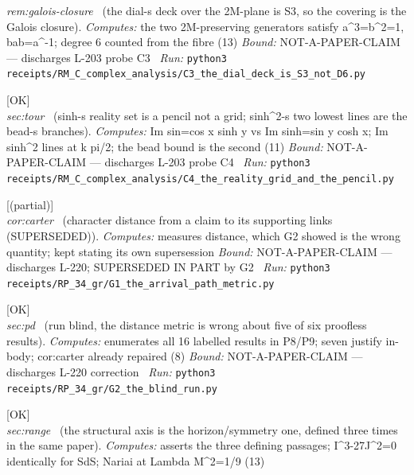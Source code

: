 \begin{description}
\textit{rem:galois-closure} \ (the dial-s deck over the 2M-plane is S3, so the covering is the Galois closure). 
\emph{Computes:} the two 2M-preserving generators satisfy a\textasciicircum{}3=b\textasciicircum{}2=1, bab=a\textasciicircum{}-1; degree 6 counted from the fibre (13)
 \emph{Bound:} NOT-A-PAPER-CLAIM --- discharges L-203 probe C3
\ \emph{Run:} \texttt{python3 receipts/RM\_C\_complex\_analysis/C3\_the\_dial\_deck\_is\_S3\_not\_D6.py}
\item[\label{rcpt:C4_the_reality_grid_and_the_pencil}\texttt{C4\_the\_reality\_grid\_and\_the\_pencil}]\hfill\textsf{[OK]}\\
\textit{sec:tour} \ (sinh-s reality set is a pencil not a grid; sinh\textasciicircum{}2-s two lowest lines are the bead-s branches). 
\emph{Computes:} Im sin=cos x sinh y vs Im sinh=sin y cosh x; Im sinh\textasciicircum{}2 lines at k pi/2; the bead bound is the second (11)
 \emph{Bound:} NOT-A-PAPER-CLAIM --- discharges L-203 probe C4
\ \emph{Run:} \texttt{python3 receipts/RM\_C\_complex\_analysis/C4\_the\_reality\_grid\_and\_the\_pencil.py}
\item[\label{rcpt:G1_the_arrival_path_metric}\texttt{G1\_the\_arrival\_path\_metric}]\hfill\textsf{[(partial)]}\\
\textit{cor:carter} \ (character distance from a claim to its supporting links (SUPERSEDED)). 
\emph{Computes:} measures distance, which G2 showed is the wrong quantity; kept stating its own supersession
 \emph{Bound:} NOT-A-PAPER-CLAIM --- discharges L-220; SUPERSEDED IN PART by G2
\ \emph{Run:} \texttt{python3 receipts/RP\_34\_gr/G1\_the\_arrival\_path\_metric.py}
\item[\label{rcpt:G2_the_blind_run}\texttt{G2\_the\_blind\_run}]\hfill\textsf{[OK]}\\
\textit{sec:pd} \ (run blind, the distance metric is wrong about five of six proofless results). 
\emph{Computes:} enumerates all 16 labelled results in P8/P9; seven justify in-body; cor:carter already repaired (8)
 \emph{Bound:} NOT-A-PAPER-CLAIM --- discharges L-220 correction
\ \emph{Run:} \texttt{python3 receipts/RP\_34\_gr/G2\_the\_blind\_run.py}
\item[\label{rcpt:G3_the_axis_names_two_orderings}\texttt{G3\_the\_axis\_names\_two\_orderings}]\hfill\textsf{[OK]}\\
\textit{sec:range} \ (the structural axis is the horizon/symmetry one, defined three times in the same paper). 
\emph{Computes:} asserts the three defining passages; I\textasciicircum{}3-27J\textasciicircum{}2=0 identically for SdS; Nariai at Lambda M\textasciicircum{}2=1/9 (13)

\end{description}
